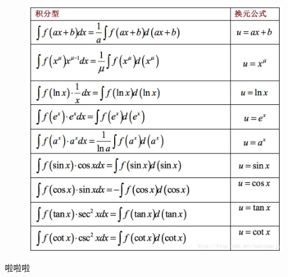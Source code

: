 \documentclass[a4paper,13.6pt]{article}
\begin{document}
\begin{CJK}{UTF8}{gbsn}
\begin{figure}[!htb]
\begin{center}
      \end{center}
    \end{figure}
    \begin{figure}[!htb]
      \begin{center}
        \includegraphics[width=0.50\linewidth]{../scoure/11.png}
      \end{center}
    \end{figure}
\newpage
啦啦啦
\end{CJK}
\end{document}
